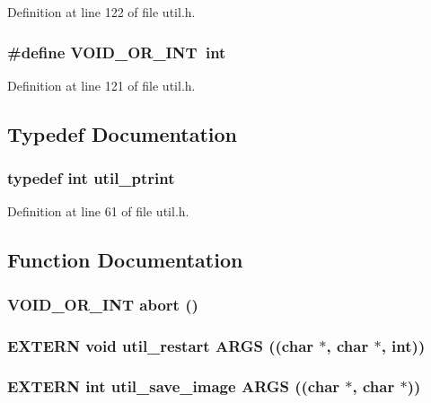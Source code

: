 Definition at line 122 of file util.h.
\subsubsection{\setlength{\rightskip}{0pt plus 5cm}\#define VOID\_\-OR\_\-INT~int}\label{util_8h_b98c118630d03869c77347eb973ecb0f}




Definition at line 121 of file util.h.

\subsection{Typedef Documentation}
\subsubsection{\setlength{\rightskip}{0pt plus 5cm}typedef int \bf{util\_\-ptrint}}\label{util_8h_b5e824003d402df8f53fcd7bd935ab0f}




Definition at line 61 of file util.h.

\subsection{Function Documentation}
\subsubsection{\setlength{\rightskip}{0pt plus 5cm}VOID\_\-OR\_\-INT abort ()}\label{util_8h_23c00958edf66c39625a0d535dee57b7}


\subsubsection{\setlength{\rightskip}{0pt plus 5cm}EXTERN void util\_\-restart ARGS ((char $\ast$, char $\ast$, int))}\label{util_8h_cb1669239a58c7e2717b53e30098adb2}


\subsubsection{\setlength{\rightskip}{0pt plus 5cm}EXTERN int util\_\-save\_\-image ARGS ((char $\ast$, char $\ast$))}\label{util_8h_4d4c7ded416c4b62410ae9996b73078b}


